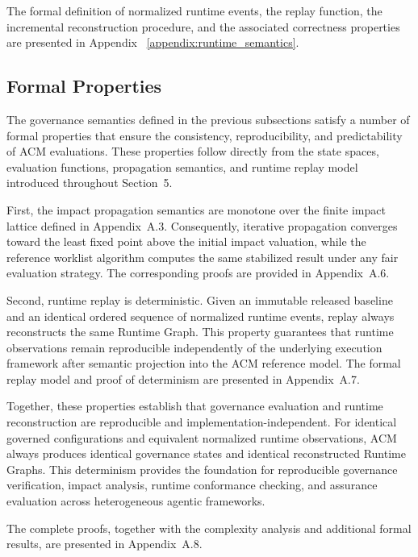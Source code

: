 \documentclass[10pt]{article}
\begin{document}
	The formal definition of normalized runtime events, the replay function, the
	incremental reconstruction procedure, and the associated correctness properties
	are presented in Appendix ~\ref{appendix:runtime_semantics}.
	
	\subsection{Formal Properties}
	\label{sec:formal_properties}
	
	The governance semantics defined in the previous subsections satisfy a number of
	formal properties that ensure the consistency, reproducibility, and
	predictability of ACM evaluations. These properties follow directly from the
	state spaces, evaluation functions, propagation semantics, and runtime replay
	model introduced throughout Section~5.
	
	First, the impact propagation semantics are monotone over the finite impact
	lattice defined in Appendix~A.3. Consequently, iterative propagation converges
	toward the least fixed point above the initial impact valuation, while the
	reference worklist algorithm computes the same stabilized result under any fair
	evaluation strategy. The corresponding proofs are provided in
	Appendix~A.6.
	
	Second, runtime replay is deterministic. Given an immutable released baseline
	and an identical ordered sequence of normalized runtime events, replay always
	reconstructs the same Runtime Graph. This property guarantees that runtime
	observations remain reproducible independently of the underlying execution
	framework after semantic projection into the ACM reference model. The formal
	replay model and proof of determinism are presented in Appendix~A.7.
	
	Together, these properties establish that governance evaluation and runtime
	reconstruction are reproducible and implementation-independent. For identical
	governed configurations and equivalent normalized runtime observations, ACM
	always produces identical governance states and identical reconstructed Runtime
	Graphs. This determinism provides the foundation for reproducible governance
	verification, impact analysis, runtime conformance checking, and assurance
	evaluation across heterogeneous agentic frameworks.
	
	The complete proofs, together with the complexity analysis and additional formal
	results, are presented in Appendix~A.8.
	
	
	
\end{document}
